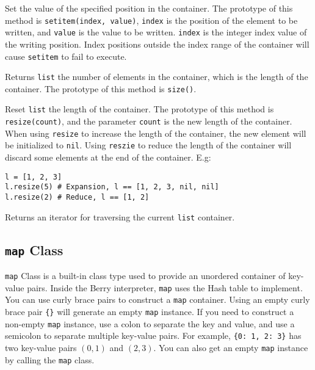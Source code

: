 
Set the value of the specified position in the container. The prototype of this method is \texttt{setitem(index, value)}, \texttt{index} is the position of the element to be written, and \texttt{value} is the value to be written. \texttt{index} is the integer index value of the writing position. Index positions outside the index range of the container will cause \texttt{setitem} to fail to execute.


Returns \texttt{list} the number of elements in the container, which is the length of the container. The prototype of this method is \texttt{size()}.


Reset \texttt{list} the length of the container. The prototype of this method is \texttt{resize(count)}, and the parameter \texttt{count} is the new length of the container. When using \texttt{resize} to increase the length of the container, the new element will be initialized to \texttt{nil}. Using \texttt{reszie} to reduce the length of the container will discard some elements at the end of the container. E.g:
\begin{lstlisting}[language=berry, numbers=none]
l = [1, 2, 3]
l.resize(5) # Expansion, l == [1, 2, 3, nil, nil]
l.resize(2) # Reduce, l == [1, 2]
\end{lstlisting}


Returns an iterator for traversing the current \texttt{list} container.

\subsection{\texttt{map} Class}

\texttt{map} Class is a built-in class type used to provide an unordered container of key-value pairs. Inside the Berry interpreter, \texttt{map} uses the Hash table to implement. You can use curly brace pairs to construct a \texttt{map} container. Using an empty curly brace pair \texttt{\{\}} will generate an empty \texttt{map} instance. If you need to construct a non-empty \texttt{map} instance, use a colon to separate the key and value, and use a semicolon to separate multiple key-value pairs. For example, \texttt{\{0: 1, 2: 3\}} has two key-value pairs $(0, 1)$ and $(2, 3)$. You can also get an empty \texttt{map} instance by calling the \texttt{map} class.

